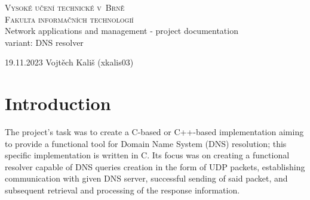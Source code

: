 \documentclass[a4paper, 11pt]{article}
\begin{document}
	\begin{titlepage}
		\begin{center}
			\LARGE\textsc{Vysoké učení technické v~Brně} \\
			\Large\textsc{Fakulta informačních technologií}\\
			\LARGE{Network applications and management - project documentation} \\
			\vspace{0.2cm}
			\large{variant: DNS resolver} \\
		\end{center}

		\Large{19.11.2023 \hfill Vojtěch Kališ (xkalis03)}
	\end{titlepage}

	\tableofcontents

	\newpage
	\section{Introduction}
	The project's task was to create a C-based or C++-based implementation aiming to provide a 
	functional tool for Domain Name System (DNS) resolution; this specific implementation is 
	written in C. Its focus was on creating a functional resolver capable of DNS queries creation in 
	the form of UDP packets, establishing communication with given DNS server, successful sending 
	of said packet, and subsequent retrieval and processing of the response information.
\end{document}
